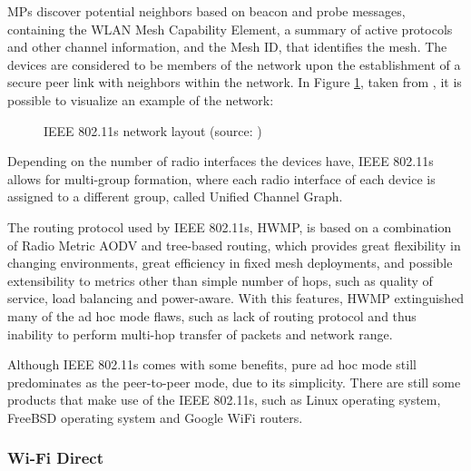 \glspl{MP} discover potential neighbors based on beacon and probe messages, containing the \gls{WLAN} Mesh Capability Element, a summary of active protocols and other channel information, and the Mesh ID, that identifies the mesh. The devices are considered to be members of the network upon the establishment of a secure peer link with neighbors within the network. In Figure \ref{fig:ieee80211s}, taken from \cite{IEEE80211s}, it is possible to visualize an example of the network: 

\begin{figure}[ht]
	\noindent{}
	\caption{\label{fig:ieee80211s} IEEE 802.11s network layout (source: \cite{IEEE80211s})}
\end{figure}

Depending on the number of radio interfaces the devices have, IEEE 802.11s allows for multi-group formation, where each radio interface of each device is assigned to a different group, called Unified Channel Graph.

The routing protocol used by IEEE 802.11s, \gls{HWMP}, is based on a combination of Radio Metric \gls{AODV} and tree-based routing, which provides great flexibility in changing environments, great efficiency in fixed mesh deployments, and possible extensibility to metrics other than simple number of hops, such as quality of service, load balancing and power-aware. With this features, \gls{HWMP} extinguished many of the ad hoc mode flaws, such as lack of routing protocol and thus inability to perform multi-hop transfer of packets and network range.

Although IEEE 802.11s comes with some benefits, pure ad hoc mode still predominates as the peer-to-peer mode, due to its simplicity. There are still some products that make use of the IEEE 802.11s, such as Linux operating system, FreeBSD operating system and Google WiFi routers.

\subsubsection{Wi-Fi Direct}
\label{subsection:wfd}

